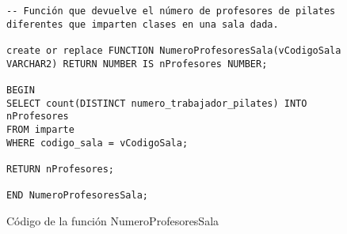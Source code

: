 \begin{figure}[H]
    \begin{tcolorbox}[sharp corners, colback=yellow!30, colframe=white!20]
        \tiny
        \begin{verbatim}
-- Función que devuelve el número de profesores de pilates diferentes que imparten clases en una sala dada.

create or replace FUNCTION NumeroProfesoresSala(vCodigoSala VARCHAR2) RETURN NUMBER IS nProfesores NUMBER;

BEGIN
SELECT count(DISTINCT numero_trabajador_pilates) INTO nProfesores
FROM imparte
WHERE codigo_sala = vCodigoSala;

RETURN nProfesores;

END NumeroProfesoresSala;
        \end{verbatim}
    \end{tcolorbox}
    \caption{Código de la función NumeroProfesoresSala}
\end{figure}


